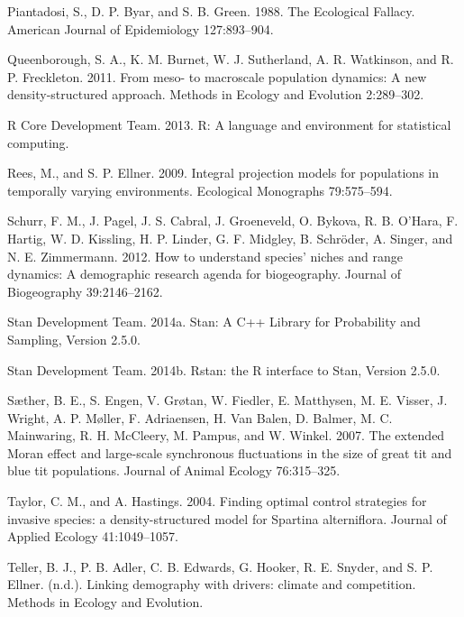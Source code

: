 \documentclass[12pt,]{article}
\begin{document}
Piantadosi, S., D. P. Byar, and S. B. Green. 1988. The Ecological
Fallacy. American Journal of Epidemiology 127:893--904.

Queenborough, S. A., K. M. Burnet, W. J. Sutherland, A. R. Watkinson,
and R. P. Freckleton. 2011. From meso- to macroscale population
dynamics: A new density-structured approach. Methods in Ecology and
Evolution 2:289--302.

R Core Development Team. 2013. R: A language and environment for
statistical computing.

Rees, M., and S. P. Ellner. 2009. Integral projection models for
populations in temporally varying environments. Ecological Monographs
79:575--594.

Schurr, F. M., J. Pagel, J. S. Cabral, J. Groeneveld, O. Bykova, R. B.
O'Hara, F. Hartig, W. D. Kissling, H. P. Linder, G. F. Midgley, B.
Schröder, A. Singer, and N. E. Zimmermann. 2012. How to understand
species' niches and range dynamics: A demographic research agenda for
biogeography. Journal of Biogeography 39:2146--2162.

Stan Development Team. 2014a. Stan: A C++ Library for Probability and
Sampling, Version 2.5.0.

Stan Development Team. 2014b. Rstan: the R interface to Stan, Version
2.5.0.

Sæther, B. E., S. Engen, V. Grøtan, W. Fiedler, E. Matthysen, M. E.
Visser, J. Wright, A. P. Møller, F. Adriaensen, H. {Van Balen}, D.
Balmer, M. C. Mainwaring, R. H. McCleery, M. Pampus, and W. Winkel.
2007. The extended Moran effect and large-scale synchronous fluctuations
in the size of great tit and blue tit populations. Journal of Animal
Ecology 76:315--325.

Taylor, C. M., and A. Hastings. 2004. Finding optimal control strategies
for invasive species: a density-structured model for Spartina
alterniflora. Journal of Applied Ecology 41:1049--1057.

Teller, B. J., P. B. Adler, C. B. Edwards, G. Hooker, R. E. Snyder, and
S. P. Ellner. (n.d.). Linking demography with drivers: climate and
competition. Methods in Ecology and Evolution.
\end{document}

